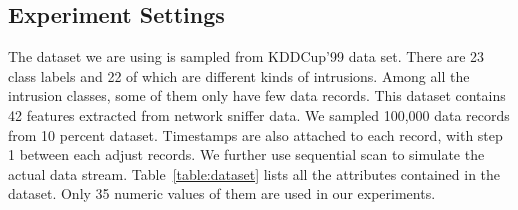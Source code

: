 \documentclass[runningheads]{llncs}
\begin{document}
	\subsection{Experiment Settings}
	
	The dataset we are using is sampled from KDDCup'99 data set. There are 23 class labels and 22 of which are different kinds of intrusions. Among all the intrusion classes, some of them only have few data records. This dataset contains 42 features extracted from network sniffer data. We sampled 100,000 data records from 10 percent dataset. Timestamps are also attached to each record, with step 1 between each adjust records. We further use sequential scan to simulate the actual data stream. Table~\ref{table:dataset} lists all the attributes contained in the dataset. Only 35 numeric values of them are used in our experiments.
	
\end{document}
